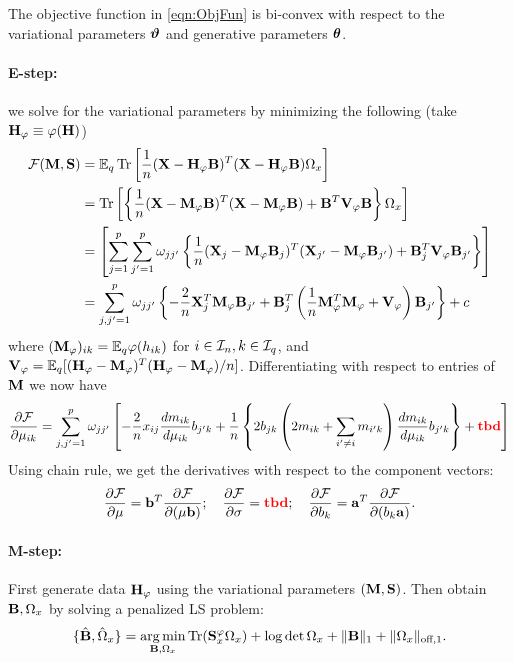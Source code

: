 \documentclass[11pt,letterpaper]{article}
\DeclareMathOperator*{\Tr}{Tr}
\DeclareMathOperator*{\argmin}{arg\,min}
\numberwithin{equation}{section}
\begin{document}
\begin{Proposition}\label{prop:biconvex}
The objective function in \eqref{eqn:ObjFun} is bi-convex with respect to the variational parameters ${\boldsymbol{\vartheta}}$ and generative parameters ${\boldsymbol{\theta}}$.
\end{Proposition}

\paragraph{E-step:} we solve for the variational parameters by minimizing the following (take ${\mathbf{H}}_\varphi \equiv \varphi({\mathbf{H}})$)
%
\begin{align*}
\cF(\bfM, \bfS) &= \BE_q \Tr \left[ \frac{1}{n} (\bfX - \bfH_\varphi \bfB )^T (\bfX - \bfH_\varphi \bfB ) \Omega_x \right]\\
&= \Tr \left[ \left\{ \frac{1}{n} (\bfX - \bfM_\varphi \bfB )^T(\bfX - \bfM_\varphi \bfB ) +
\bfB^T \bfV_\varphi \bfB \right\} \Omega_x \right]\\
&= \left[ \sum_{j=1}^p \sum_{j'=1}^p \omega_{jj'} \left\{
\frac{1}{n} (\bfX_j - \bfM_\varphi \bfB_j)^T (\bfX_{j'} - \bfM_\varphi \bfB_{j'}) + \bfB_j^T \bfV_\varphi \bfB_{j'}
\right\}\right]\\
&= \sum_{j,j'=1}^p \omega_{jj'} \left\{
-\frac{2}{n} \bfX_j^T \bfM_\varphi \bfB_{j'} + \bfB_j^T \left( \frac{1}{n} \bfM_\varphi^T \bfM_\varphi + \bfV_\varphi \right) \bfB_{j'}\right\} + c
\end{align*}
%
where $({\mathbf{M}}_\varphi)_{ik} = {\mathbb{E}}_q \varphi (h_{ik})$ for $i \in {\cal{I}}_n, k \in {\cal{I}}_q$, and ${\mathbf{V}}_\varphi = {\mathbb{E}}_q [({\mathbf{H}}_\varphi - {\mathbf{M}}_\varphi)^T ({\mathbf{H}}_\varphi - {\mathbf{M}}_\varphi)/n]$. Differentiating with respect to entries of ${\mathbf{M}}$ we now have
%
\begin{align*}
\frac{\partial {\cal{F}}}{\partial \mu_{ik}} = \sum_{j,j'=1}^p \omega_{jj'} \left[
-\frac{2}{n} x_{ij} \frac{d m_{ik}}{d \mu_{ik}} b_{j'k} +
\frac{1}{n} \left\{ 2 b_{jk} \left( 2 m_{ik} + \sum_{i' \neq i} m_{i'k} \right) \frac{dm_{ik}}{d\mu_{ik}} b_{j'k} \right\} +
{\color{red} \bf tbd}
\right]
\end{align*}
%
Using chain rule, we get the derivatives with respect to the component vectors:
%
$$
\frac{\partial {\cal{F}}}{\partial \mu} = {\bf{b}}^T \frac{\partial {\cal{F}}}{\partial (\mu {\bf{b}})}; \quad
\frac{\partial {\cal{F}}}{\partial \sigma} = {\color{red} \bf tbd}; \quad
\frac{\partial {\cal{F}}}{\partial b_k} = {\bf{a}}^T \frac{\partial {\cal{F}}}{\partial (b_k {\bf{a}})}.
$$

\paragraph{M-step:} First generate data ${\mathbf{H}}_\varphi$ using the variational parameters $({\mathbf{M}}, {\mathbf{S}})$. Then obtain ${\mathbf{B}},\Omega_x$ by solving a penalized LS  problem:
%
$$
\{ \hat \bfB, \hat \Omega_x \} = \argmin_{\bfB,\Omega_x} \Tr(\bfS^\varphi_x \Omega_x) + \log \det \Omega_x + \| \bfB \|_1 + \| \Omega_x \|_{\text{off},1}.
$$
%
\end{document}
